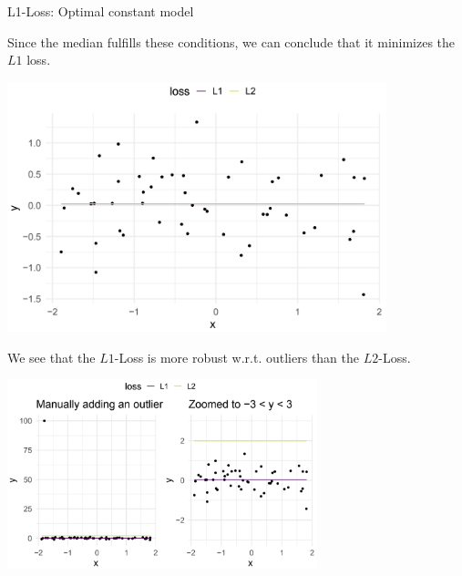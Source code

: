 \begin{vbframe}{L1-Loss: Optimal constant model}
\begin{itemize}
  Since the median fulfills these conditions, we can conclude that it minimizes 
  the $L1$ loss.
\end{itemize}

\framebreak


\begin{center}
\includegraphics[width = 11cm ]{figure_man/L1-loss.png} \\
\end{center}

\framebreak 

We see that the $L1$-Loss is more robust w.r.t. outliers than the $L2$-Loss. 
\vspace{0.3cm}


\begin{center}
\includegraphics[width = 9cm ]{figure_man/L1andL2-loss.png} \\
\end{center}


\end{vbframe}


\endlecture

